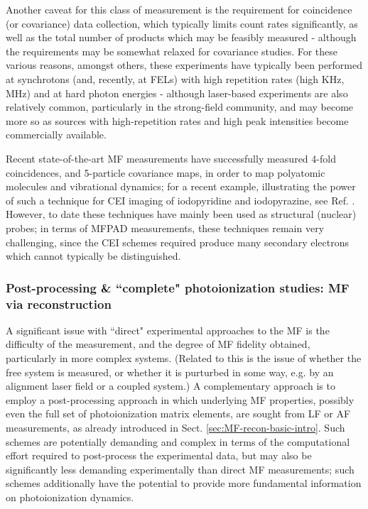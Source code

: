 \documentclass[10pt]{article}
\begin{document}
Another caveat for this class of measurement is the requirement for coincidence (or covariance) data collection, which typically limits count rates significantly, as well as the total number of products which may be feasibly measured - although the requirements may be somewhat relaxed for covariance studies. For these various reasons, amongst others, these experiments have typically been performed at synchrotons (and, recently, at FELs) with high repetition rates (high KHz, MHz) and at hard photon energies - although laser-based experiments are also relatively common, particularly in the strong-field community, and may become more so as sources with high-repetition rates and high peak intensities become commercially available. 

Recent state-of-the-art MF measurements have successfully measured 4-fold coincidences, and 5-particle covariance maps, in order to map polyatomic molecules and vibrational dynamics; %
for a recent example, illustrating the power of such a technique for CEI imaging of iodopyridine and iodopyrazine, see Ref.   \cite{boll2022XrayMultiphotoninducedCoulomb}. However, to date these techniques have mainly been used as structural (nuclear) probes; in terms of MFPAD measurements, these techniques remain very challenging, since the CEI schemes required produce many secondary electrons which cannot typically be distinguished. 



\subsubsection{Post-processing \& ``complete" photoionization studies: MF via reconstruction\label{sec:MF-recon-expt}}


A significant issue with ``direct" experimental approaches to the MF is the difficulty of the measurement, and the degree of MF fidelity obtained, particularly in more complex systems. (Related to this is the issue of whether the free system is measured, or whether it is purturbed in some way, e.g. by an alignment laser field or a coupled system.) A complementary approach is to employ a post-processing approach in which underlying MF properties, possibly even the full set of photoionization matrix elements, are sought from LF or AF measurements, as already introduced in Sect. \ref{sec:MF-recon-basic-intro}. Such schemes are potentially demanding and complex in terms of the computational effort required to post-process the experimental data, but may also be significantly less demanding experimentally than direct MF measurements; such schemes additionally have the potential to provide more fundamental information on photoionization dynamics.
\end{document}
